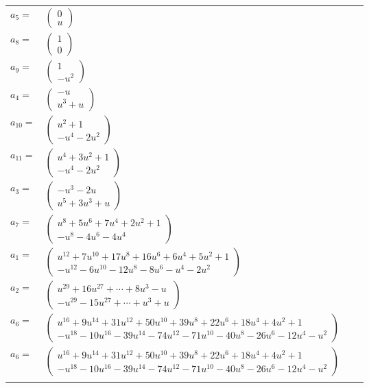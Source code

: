 \documentclass[1p]{elsarticle_modified}
\theoremstyle{definition}
\begin{document}
\begin{tabular}{m{7pt} m{180pt} m{7pt} m{180pt} }
\flushright $a_{5}=$&$\begin{pmatrix}0\\u\end{pmatrix}$ \\
\flushright $a_{8}=$&$\begin{pmatrix}1\\0\end{pmatrix}$ \\
\flushright $a_{9}=$&$\begin{pmatrix}1\\- u^2\end{pmatrix}$ \\
\flushright $a_{4}=$&$\begin{pmatrix}- u\\u^3+u\end{pmatrix}$ \\
\flushright $a_{10}=$&$\begin{pmatrix}u^2+1\\- u^4-2 u^2\end{pmatrix}$ \\
\flushright $a_{11}=$&$\begin{pmatrix}u^4+3 u^2+1\\- u^4-2 u^2\end{pmatrix}$ \\
\flushright $a_{3}=$&$\begin{pmatrix}- u^3-2 u\\u^5+3 u^3+u\end{pmatrix}$ \\
\flushright $a_{7}=$&$\begin{pmatrix}u^8+5 u^6+7 u^4+2 u^2+1\\- u^8-4 u^6-4 u^4\end{pmatrix}$ \\
\flushright $a_{1}=$&$\begin{pmatrix}u^{12}+7 u^{10}+17 u^8+16 u^6+6 u^4+5 u^2+1\\- u^{12}-6 u^{10}-12 u^8-8 u^6- u^4-2 u^2\end{pmatrix}$ \\
\flushright $a_{2}=$&$\begin{pmatrix}u^{29}+16 u^{27}+\cdots+8 u^3- u\\- u^{29}-15 u^{27}+\cdots+u^3+u\end{pmatrix}$ \\
\flushright $a_{6}=$&$\begin{pmatrix}u^{16}+9 u^{14}+31 u^{12}+50 u^{10}+39 u^8+22 u^6+18 u^4+4 u^2+1\\- u^{18}-10 u^{16}-39 u^{14}-74 u^{12}-71 u^{10}-40 u^8-26 u^6-12 u^4- u^2\end{pmatrix}$\\ \flushright $a_{6}=$&$\begin{pmatrix}u^{16}+9 u^{14}+31 u^{12}+50 u^{10}+39 u^8+22 u^6+18 u^4+4 u^2+1\\- u^{18}-10 u^{16}-39 u^{14}-74 u^{12}-71 u^{10}-40 u^8-26 u^6-12 u^4- u^2\end{pmatrix}$\\&\end{tabular}
\end{document}
